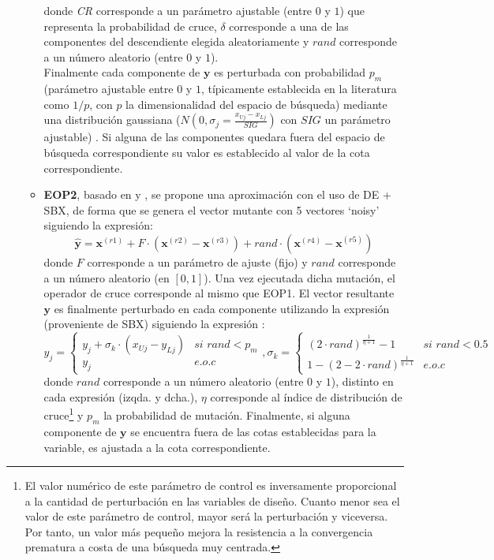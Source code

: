 \begin{enumerate}
\begin{itemize}
        donde \textit{CR} corresponde a un parámetro ajustable (entre $0$ y $1$) que representa la probabilidad de cruce, $\delta$ corresponde a una de las componentes del descendiente elegida aleatoriamente y $rand$ corresponde a un número aleatorio (entre $0$ y $1$).\\
        
        Finalmente cada componente de $\boldsymbol{y}$ es perturbada con probabilidad $p_m$ (parámetro ajustable entre $0$ y $1$, típicamente establecida en la literatura como $1/p$, con $p$ la dimensionalidad del espacio de búsqueda) mediante una distribución gaussiana ($N(0,\sigma_{j} = \frac{x_{Uj} - x_{Lj}}{SIG})$ con $SIG$ un parámetro ajustable) . Si alguna de las componentes quedara fuera del espacio de búsqueda correspondiente su valor es establecido al valor de la cota correspondiente.\\
        
        \item \textbf{EOP2}, basado en \cite{Li2009} y \cite{Li2014}, se propone una aproximación con el uso de DE + SBX, de forma que se genera el vector mutante con 5 vectores `noisy' siguiendo la expresión: $$ \boldsymbol{\hat{y}}=\boldsymbol{x}^{(r1)} + F \cdot (\boldsymbol{x}^{(r2)}-\boldsymbol{x}^{(r3)}) + rand \cdot (\boldsymbol{x}^{(r4)}-\boldsymbol{x}^{(r5)})$$ donde  $F$ corresponde a un parámetro de ajuste (fijo) y $rand$ corresponde a un número aleatorio (en $[0,1]$). Una vez ejecutada dicha mutación, el operador de cruce corresponde al mismo que EOP1. El vector resultante $\boldsymbol{y}$ es finalmente perturbado en cada componente utilizando la expresión (proveniente de SBX) siguiendo la expresión : $$ y_j = \left\lbrace \begin{array}{ll}
            y_j + \sigma_{k} \cdot (x_{Uj}-y_{Lj}) & \textit{si } rand < p_{m} \\
            y_j & e.o.c
        \end{array} \right., \sigma_k = \left\lbrace \begin{array}{ll}
            (2 \cdot rand)^{\frac{1}{\eta+1}}-1 & \textit{si } rand < 0.5 \\
            1 - (2 - 2 \cdot rand)^{\frac{1}{\eta+1}} & e.o.c
        \end{array} \right.$$ 
        donde $rand$ corresponde a un número aleatorio (entre $0$ y $1$), distinto en cada expresión (izqda. y dcha.), $\eta$ corresponde al índice de distribución de cruce\footnote{El valor numérico de este parámetro de control es inversamente proporcional a la cantidad de perturbación en las variables de diseño. Cuanto menor sea el valor de este parámetro de control, mayor será la perturbación y viceversa. Por tanto, un valor más pequeño mejora la resistencia a la convergencia prematura a costa de una búsqueda muy centrada.} y $p_{m}$ la probabilidad de mutación. Finalmente, si alguna componente de $\boldsymbol{y}$ se encuentra fuera de las cotas establecidas para la variable,  es ajustada a la cota correspondiente.\\
        

\end{itemize}
\end{enumerate}
